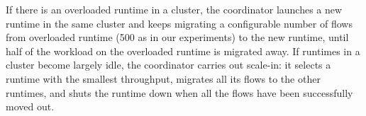 If there is an overloaded runtime in a cluster, the coordinator launches a new runtime in the same cluster and keeps migrating a configurable number of flows from overloaded runtime (500 as in our experiments) to the new runtime, until half of the workload on the overloaded runtime is migrated away. %
If runtimes in a cluster become largely idle, the coordinator carries out scale-in: it selects a runtime with the smallest throughput, migrates all its flows to the other runtimes, and shuts the runtime down when all the flows have been successfully moved out.

